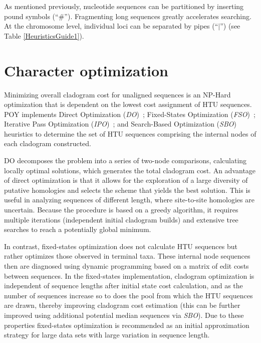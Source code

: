 As mentioned previously, nucleotide sequences can be  partitioned 
by inserting pound symbols (``\#'').  Fragmenting long sequences greatly accelerates searching.
At the chromosome level, individual loci can be separated by pipes
(``$\vert$'') (see Table \ref{HeuristicsGuide1}).

\section{Character optimization}
Minimizing overall cladogram cost for unaligned sequences is an NP-Hard 
optimization that is dependent on the lowest cost assignment of HTU sequences.  
POY implements Direct Optimization (\emph{DO})~\cite{wheeler1996}; 
Fixed-States Optimization (\emph{FSO})~\cite{wheeler1999a}; Iterative 
Pass Optimization (\emph{IPO})~\cite{wheeler2003a}; and Search-Based 
Optimization (\emph{SBO})~\cite{wheeler2003b} heuristics 
to determine the set of HTU sequences comprising the internal nodes of 
each cladogram constructed.

DO decomposes the problem into a series of two-node
comparisons, calculating locally optimal solutions, which generates
the total cladogram cost.  An advantage of direct optimization is
that it allows for the exploration of a large diversity of putative
homologies and selects the scheme that yields the best solution.
This is useful in analyzing sequences of different length, where
site-to-site homologies are uncertain.  Because the procedure is
based on a greedy algorithm, it requires multiple iterations
(independent initial cladogram builds) and extensive tree searches
to reach a potentially global minimum.

In contrast, fixed-states optimization does not calculate HTU
sequences but rather optimizes those observed in terminal taxa.
These internal node sequences then are diagnosed using dynamic
programming based on a matrix of edit costs between sequences.  In
the fixed-states implementation, cladogram optimization is independent
of sequence lengths after initial state cost calculation, and as
the number of sequences increase so to does the pool from which the
HTU sequences are drawn, thereby improving cladogram cost estimation
(this can be further improved using additional potential median
sequences via \emph{SBO}).  Due to these properties fixed-states optimization
is recommended as an initial approximation strategy for large data
sets with large variation in sequence length.


